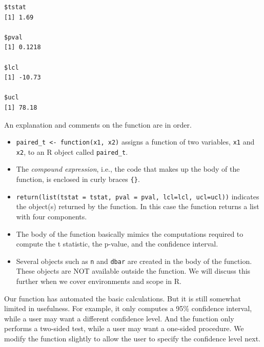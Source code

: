 \documentclass[]{krantz}
\providecommand{\tightlist}{%
  \setlength{\itemsep}{0pt}\setlength{\parskip}{0pt}}
\begin{document}
\begin{verbatim}
$tstat
[1] 1.69

$pval
[1] 0.1218

$lcl
[1] -10.73

$ucl
[1] 78.18
\end{verbatim}

An explanation and comments on the function are in order.

\begin{itemize}
\tightlist
\item
  \texttt{paired\_t\ \textless{}-\ function(x1,\ x2)} assigns a function of two variables, \texttt{x1} and \texttt{x2}, to an R object called \texttt{paired\_t}.
\item
  The \emph{compound expression}, i.e., the code that makes up the body of the function, is enclosed in curly braces \texttt{\{\}}.
\item
  \texttt{return(list(tstat\ =\ tstat,\ pval\ =\ pval,\ lcl=lcl,\ ucl=ucl))} indicates the object(s) returned by the function. In this case the function returns a list with four components.
\item
  The body of the function basically mimics the computations required to compute the t statistic, the p-value, and the confidence interval.
\item
  Several objects such as \texttt{n} and \texttt{dbar} are created in the body of the function. These objects are NOT available outside the function. We will discuss this further when we cover environments and scope in R.
\end{itemize}

Our function has automated the basic calculations. But it is still somewhat limited in usefulness. For example, it only computes a 95\% confidence interval, while a user may want a different confidence level. And the function only performs a two-sided test, while a user may want a one-sided procedure. We modify the function slightly to allow the user to specify the confidence level next.
\end{document}
